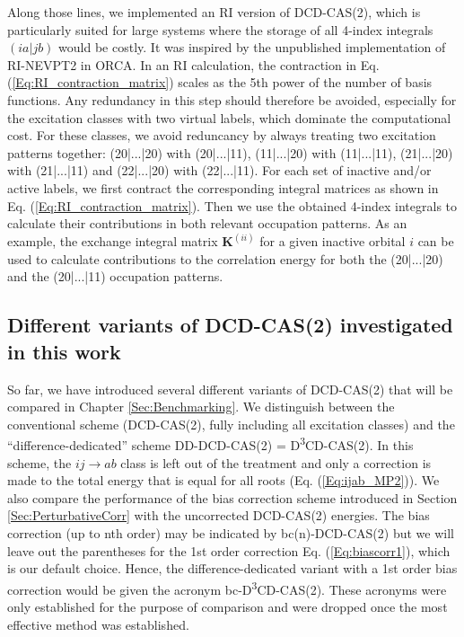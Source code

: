Along those lines, we implemented an RI version of DCD-CAS(2), which is particularly suited for large systems where the storage of all 4-index integrals $(ia|jb)$ would be costly. It was inspired by the unpublished implementation of RI-NEVPT2 in ORCA. In an RI calculation, the contraction in Eq. (\ref{Eq:RI_contraction_matrix}) scales as the 5th power of the number of basis functions. Any redundancy in this step should therefore be avoided, especially for the excitation classes with two virtual labels, which dominate the computational cost. For these classes, we avoid reduncancy by always treating two excitation patterns together: (20|...|20) with (20|...|11), (11|...|20) with (11|...|11), (21|...|20) with (21|...|11) and (22|...|20) with (22|...|11).
For each set of inactive and/or active labels, we first contract the corresponding integral matrices as shown in Eq. (\ref{Eq:RI_contraction_matrix}). Then we use the obtained 4-index integrals to calculate their contributions in both relevant occupation patterns. As an example, the exchange integral matrix $\mathbf{K}^{(ii)}$ for a given inactive orbital $i$ can be used to calculate contributions to the correlation energy for both the (20|...|20) and the (20|...|11) occupation patterns.

\subsection{Different variants of DCD-CAS(2) investigated in this work}
\label{Sec:DCD_variants}
So far, we have introduced several different variants of DCD-CAS(2) that will be compared in Chapter \ref{Sec:Benchmarking}. We distinguish between the conventional scheme (DCD-CAS(2), fully including all excitation classes) and the ``difference-dedicated'' scheme DD-DCD-CAS(2) = D\textsuperscript{3}CD-CAS(2). In this scheme, the $ij\rightarrow ab$ class is left out of the treatment and only a correction is made to the total energy that is equal for all roots (Eq. (\ref{Eq:ijab_MP2})). We also compare the performance of the bias correction scheme introduced in Section \ref{Sec:PerturbativeCorr} with the uncorrected DCD-CAS(2) energies. The bias correction (up to nth order) may be indicated by bc(n)-DCD-CAS(2) but we will leave out the parentheses for the 1st order correction Eq. (\ref{Eq:biascorr1}), which is our default choice. Hence, the difference-dedicated variant with a 1st order bias correction would be given the acronym bc-D\textsuperscript{3}CD-CAS(2). These acronyms were only established for the purpose of comparison and were dropped once the most effective method was established.\cite{PathaLN_2017_234109}

